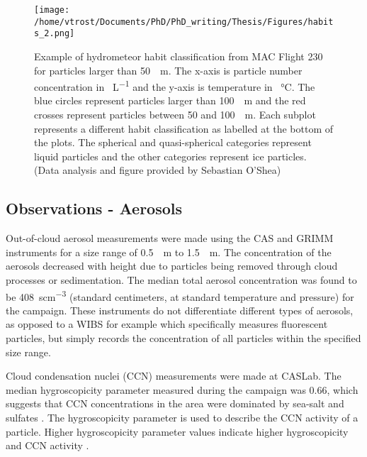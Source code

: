 \begin{figure}[H]
	\centering
	\texttt{[image: /home/vtrost/Documents/PhD/PhD\_writing/Thesis/Figures/habits\_2.png]}
	\caption{Example of hydrometeor habit classification from MAC Flight 230 for particles larger than \SI{50}{\mu m}. The x-axis is particle number concentration in \SI{}{L^{-1}} and the y-axis is temperature in \SI{}{\degreeCelsius}. The blue circles represent particles larger than \SI{100}{\mu m} and the red crosses represent particles between \SI{50}{} and \SI{100}{\mu m}. Each subplot represents a different habit classification as labelled at the bottom of the plots. The spherical and quasi-spherical categories represent liquid particles and the other categories represent ice particles. (Data analysis and figure provided by Sebastian O'Shea)}
	\label{fig:habits_2}
\end{figure}

\subsection{Observations - Aerosols}
Out-of-cloud aerosol measurements were made using the CAS and GRIMM instruments for a size range of \SI{0.5}{\mu m} to \SI{1.5}{\mu m}. The concentration of the aerosols decreased with height due to particles being removed through cloud processes or sedimentation. The median total aerosol concentration was found to be \SI{408}{scm^{-3}} (standard centimeters, at standard temperature and pressure) for the campaign. These instruments do not differentiate different types of aerosols, as opposed to a WIBS for example which specifically measures fluorescent particles, but simply records the concentration of all particles within the specified size range. \citep{oshea2017}

Cloud condensation nuclei (CCN) measurements were made at CASLab. The median hygroscopicity parameter measured during the campaign was 0.66, which suggests that CCN concentrations in the area were dominated by sea-salt and sulfates \citep{oshea2017}. The hygroscopicity parameter is used to describe the CCN activity of a particle. Higher hygroscopicity parameter values indicate higher hygroscopicity and CCN activity \citep{pett2007}. 

